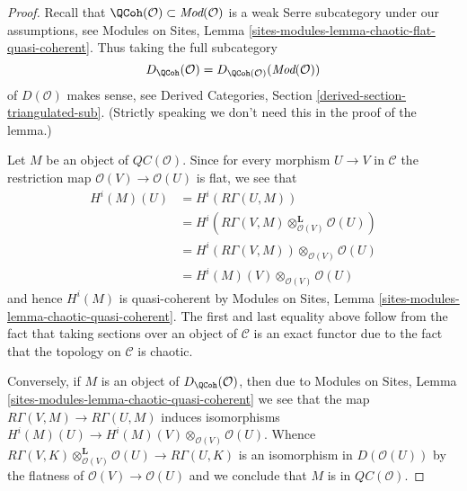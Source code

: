\begin{proof}
Recall that $\QCoh(\mathcal{O}) \subset \textit{Mod}(\mathcal{O})$
is a weak Serre subcategory under our assumptions, see
Modules on Sites, Lemma \ref{sites-modules-lemma-chaotic-flat-quasi-coherent}.
Thus taking the full subcategory
$$
D_\QCoh(\mathcal{O}) = D_{\QCoh(\mathcal{O})}(\textit{Mod}(\mathcal{O}))
$$
of $D(\mathcal{O})$ makes sense, see Derived Categories, Section
\ref{derived-section-triangulated-sub}. (Strictly speaking we don't need
this in the proof of the lemma.)

\medskip\noindent
Let $M$ be an object of $\mathit{QC}(\mathcal{O})$. Since for every
morphism $U \to V$ in $\mathcal{C}$ the restriction map
$\mathcal{O}(V) \to \mathcal{O}(U)$ is flat, we see that
\begin{align*}
H^i(M)(U)
& =
H^i(R\Gamma(U, M)) \\
& =
H^i(R\Gamma(V, M) \otimes_{\mathcal{O}(V)}^\mathbf{L} \mathcal{O}(U)) \\
& =
H^i(R\Gamma(V, M)) \otimes_{\mathcal{O}(V)} \mathcal{O}(U) \\
& =
H^i(M)(V) \otimes_{\mathcal{O}(V)} \mathcal{O}(U)
\end{align*}
and hence $H^i(M)$ is quasi-coherent by
Modules on Sites, Lemma \ref{sites-modules-lemma-chaotic-quasi-coherent}.
The first and last equality above follow from the fact that
taking sections over an object of $\mathcal{C}$ is an exact functor
due to the fact that the topology on $\mathcal{C}$ is chaotic.

\medskip\noindent
Conversely, if $M$ is an object of $D_\QCoh(\mathcal{O})$, then due to
Modules on Sites, Lemma \ref{sites-modules-lemma-chaotic-quasi-coherent}
we see that the map $R\Gamma(V, M) \to R\Gamma(U, M)$ induces isomorphisms
$H^i(M)(U) \to H^i(M)(V) \otimes_{\mathcal{O}(V)} \mathcal{O}(U)$.
Whence $R\Gamma(V, K) \otimes_{\mathcal{O}(V)}^\mathbf{L} \mathcal{O}(U)
\to R\Gamma(U, K)$ is an isomorphism in $D(\mathcal{O}(U))$ by the flatness
of $\mathcal{O}(V) \to \mathcal{O}(U)$ and we
conclude that $M$ is in $\mathit{QC}(\mathcal{O})$.
\end{proof}

